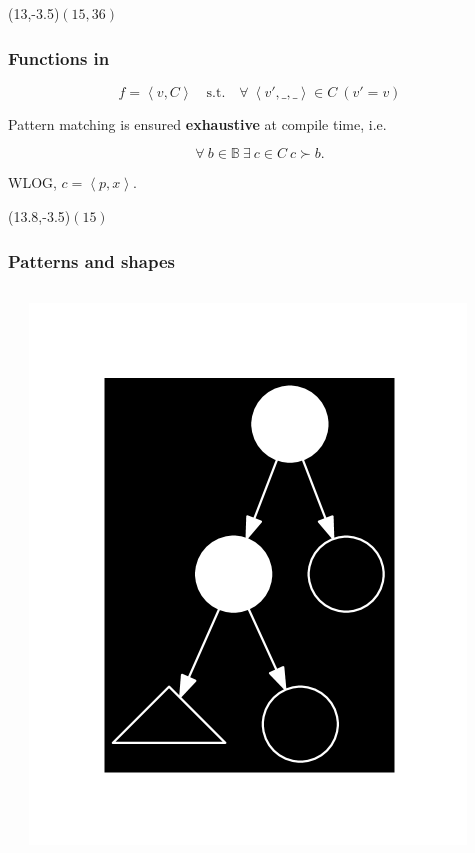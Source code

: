 \begin{frame}

\begin{textblock}{1}(13,-3.5)$(15,36)$\end{textblock}

\frametitle{Functions in \D{}}

$$f = \left\langle v, C \right\rangle \quad \text{s.t.} \quad \forall\
\left\langle v',\_,\_ \right\rangle \in C\ \left( v'=v \right)$$


\begin{center}

Pattern matching is ensured {\bf exhaustive} at compile time, i.e.

$$\forall\ b \in \mathbb{B}\ \exists\ c \in C\ c\succ b.$$

WLOG, $c = \left\langle p,x \right\rangle$.

\end{center}

\end{frame}

\begin{frame}[fragile]

\begin{textblock}{1}(13.8,-3.5)$(15)$\end{textblock}

\frametitle{Patterns and shapes}

\begin{columns}
\begin{center}
\end{center}

\includegraphics[scale=0.5]{figures/shape}

\end{columns}

\end{frame}


